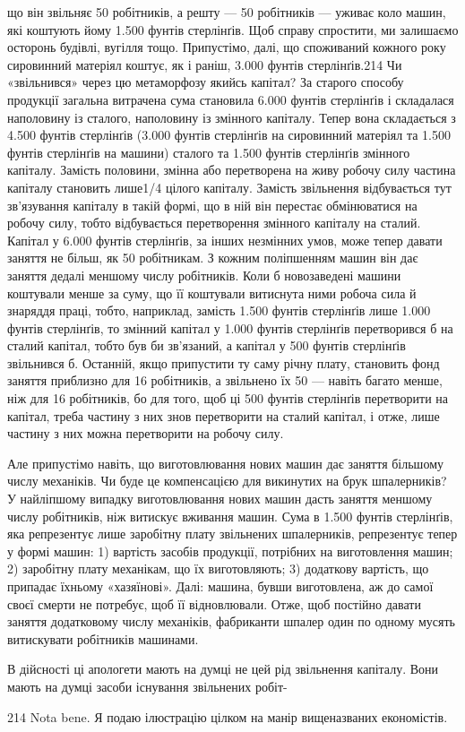 що він звільняє 50 робітників, а решту — 50 робітників — уживає
коло машин, які коштують йому 1.500 фунтів стерлінґів. Щоб
справу спростити, ми залишаємо осторонь будівлі, вугілля тощо.
Припустімо, далі, що споживаний кожного року сировинний
матеріял коштує, як і раніш, 3.000 фунтів стерлінґів.214 Чи
«звільнився» через цю метаморфозу якийсь капітал? За старого
способу продукції загальна витрачена сума становила 6.000 фунтів
стерлінґів і складалася наполовину із сталого, наполовину із
змінного капіталу. Тепер вона складається з 4.500 фунтів стерлінґів
(3.000 фунтів стерлінґів на сировинний матеріял та 1.500 фунтів
стерлінґів на машини) сталого та 1.500 фунтів стерлінґів змінного
капіталу. Замість половини, змінна або перетворена на живу робочу
силу частина капіталу становить лише1/4 цілого капіталу. Замість
звільнення відбувається тут зв’язування капіталу в такій формі,
що в ній він перестає обмінюватися на робочу силу, тобто відбувається
перетворення змінного капіталу на сталий. Капітал у 6.000
фунтів стерлінґів, за інших незмінних умов, може тепер давати заняття
не більш, як 50 робітникам. З кожним поліпшенням машин він
дає заняття дедалі меншому числу робітників. Коли б новозаведені
машини коштували менше за суму, що її коштували витиснута
ними робоча сила й знаряддя праці, тобто, наприклад, замість
1.500 фунтів стерлінґів лише 1.000 фунтів стерлінґів, то змінний
капітал у 1.000 фунтів стерлінґів перетворився б на сталий капітал,
тобто був би зв’язаний, а капітал у 500 фунтів стерлінґів
звільнився б. Останній, якщо припустити ту саму річну плату,
становить фонд заняття приблизно для 16 робітників, а звільнено
їх 50 — навіть багато менше, ніж для 16 робітників, бо для того,
щоб ці 500 фунтів стерлінґів перетворити на капітал, треба частину
з них знов перетворити на сталий капітал, і отже, лише частину
з них можна перетворити на робочу силу.

Але припустімо навіть, що виготовлювання нових машин дає
заняття більшому числу механіків. Чи буде це компенсацією
для викинутих на брук шпалерників? У найліпшому випадку
виготовлювання нових машин дасть заняття меншому числу
робітників, ніж витискує вживання машин. Сума в 1.500 фунтів
стерлінґів, яка репрезентує лише заробітну плату звільнених
шпалерників, репрезентує тепер у формі машин: 1) вартість засобів
продукції, потрібних на виготовлення машин; 2) заробітну
плату механікам, що їх виготовляють; 3) додаткову вартість, що
припадає їхньому «хазяїнові». Далі: машина, бувши виготовлена,
аж до самої своєї смерти не потребує, щоб її відновлювали. Отже,
щоб постійно давати заняття додатковому числу механіків, фабриканти
шпалер один по одному мусять витискувати робітників
машинами.

В дійсності ці апологети мають на думці не цей рід звільнення
капіталу. Вони мають на думці засоби існування звільнених робіт-

214 Nota bene. Я подаю ілюстрацію цілком на манір вищеназваних
економістів.
